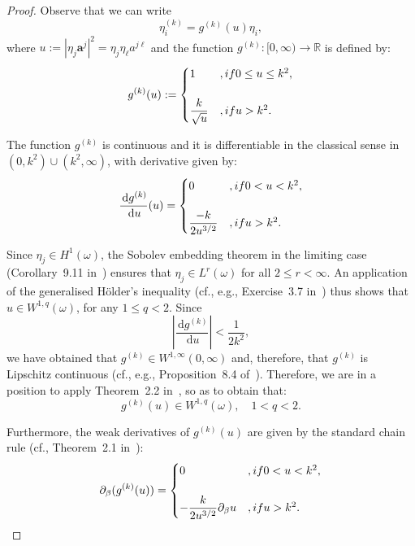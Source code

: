 \documentclass{amsart}
\def\dd{\, \mathrm{d}}
\begin{document}
\begin{proof}
	Observe that we can write
	\begin{equation*}
		\eta_i^{(k)}=g^{(k)}(u) \eta_i,
	\end{equation*}
	where $u:=|\eta_j\bm{a}^j|^2=\eta_j\eta_\ell a^{j\ell}$ and the function $g^{(k)}:[0,\infty)\to\mathbb{R}$ is defined by:
	\begin{equation*}
		g^{(k)}(u):=
		\begin{cases}
			1&, \textup{ if }0 \le u \le k^2,\\
			\\
			\dfrac{k}{\sqrt{u}}&, \textup{ if }u>k^2.
		\end{cases}
	\end{equation*}
	
	The function $g^{(k)}$ is continuous and it is differentiable in the classical sense in $(0,k^2) \cup (k^2,\infty)$, with derivative given by:
	\begin{equation*}
		\dfrac{\dd g^{(k)}}{\dd u}(u)=
		\begin{cases}
			0&, \textup{ if }0 < u < k^2,\\
			\\
			\dfrac{-k}{2u^{3/2}}&, \textup{ if }u>k^2.
		\end{cases}
	\end{equation*}
	
	Since $\eta_j \in H^1(\omega)$, the Sobolev embedding theorem in the limiting case (Corollary~9.11 in~\cite{Brez11}) ensures that $\eta_j \in L^r(\omega)$ for all $2\le r <\infty$. An application of the generalised H\"older's inequality (cf., e.g., Exercise~3.7 in~\cite{CanDAp}) thus shows that $u\in W^{1,q}(\omega)$, for any $1\le q <2$. Since 
	\begin{equation*}
		\left|\frac{\dd g^{(k)}}{\dd u}\right|<\frac{1}{2k^2},
	\end{equation*}
	we have obtained that $g^{(k)} \in W^{1,\infty}(0,\infty)$ and, therefore, that $g^{(k)}$ is Lipschitz continuous (cf., e.g., Proposition~8.4 of~\cite{Brez11}). Therefore, we are in a position to apply Theorem~2.2 in~\cite{MarMiz1972}, so as to obtain that:
	\begin{equation*}
		g^{(k)}(u) \in W^{1,q}(\omega),\quad 1<q <2.
	\end{equation*}
	
	Furthermore, the weak derivatives of $g^{(k)}(u)$ are given by the standard chain rule (cf., Theorem~2.1 in~\cite{MarMiz1972}):
	\begin{equation*}
		\partial_\beta(g^{(k)}(u))=
		\begin{cases}
			0&,\textup{ if }0<u<k^2,\\
			\\
			-\dfrac{k}{2u^{3/2}}\partial_\beta u&,\textup{ if }u>k^2.
		\end{cases}
	\end{equation*}
	

\end{proof}
\end{document}
